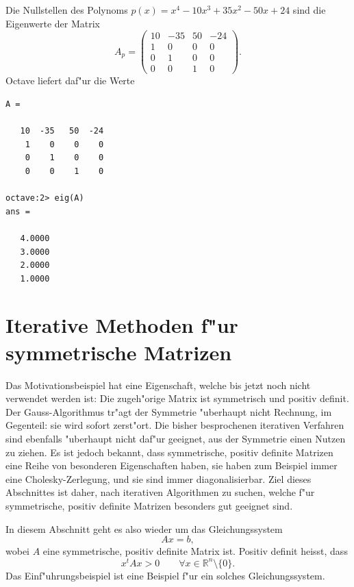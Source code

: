 \begin{beispiel}
Die Nullstellen des Polynoms $p(x)=x^4-10x^3+35x^2-50x+24$ sind die 
Eigenwerte der Matrix
\[
A_p=\begin{pmatrix}
10&-35&50&-24\\
 1&  0& 0&  0\\
 0&  1& 0&  0\\
 0&  0& 1&  0
\end{pmatrix}.
\]
Octave liefert daf"ur die Werte 
\begin{verbatim}
A =

   10  -35   50  -24
    1    0    0    0
    0    1    0    0
    0    0    1    0

octave:2> eig(A)
ans =

   4.0000
   3.0000
   2.0000
   1.0000

\end{verbatim}
\end{beispiel}

\section{Iterative Methoden f"ur symmetrische Matrizen}
Das Motivationsbeispiel hat eine Eigenschaft, welche bis jetzt noch
nicht verwendet werden ist:
Die zugeh"orige Matrix ist symmetrisch und positiv definit.
Der Gauss-Algorithmus tr"agt der Symmetrie "uberhaupt nicht Rechnung,
im Gegenteil: sie wird sofort zerst"ort.
Die bisher besprochenen iterativen Verfahren sind ebenfalls "uberhaupt
nicht daf"ur geeignet, aus der Symmetrie einen Nutzen zu ziehen.
Es ist jedoch bekannt, dass symmetrische, positiv definite Matrizen
eine Reihe von besonderen Eigenschaften haben, sie haben zum Beispiel
immer eine Cholesky-Zerlegung, und sie sind immer diagonalisierbar.
Ziel dieses Abschnittes ist daher, nach iterativen Algorithmen zu
suchen, welche f"ur symmetrische, positiv definite Matrizen besonders
gut geeignet sind.

In diesem Abschnitt geht es also wieder um das Gleichungssystem
\[
Ax=b,
\]
wobei $A$ eine symmetrische, positiv definite Matrix ist.
Positiv definit heisst, dass 
\[
x^tAx > 0\qquad \forall x\in\mathbb R^n\setminus\{0\}.
\]
Das Einf"uhrungsbeispiel ist eine Beispiel f"ur ein solches Gleichungssystem.


